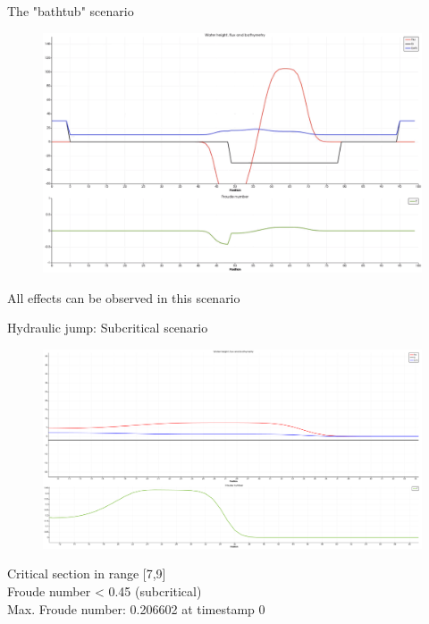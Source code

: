 \documentclass[shortpres]{beamer}
\newcommand{\imgfullscale}{0.75}
\begin{document}
\begin{frame}{The "bathtub" scenario}
	\begin{figure}
		\includegraphics[clip, width=\imgfullscale\linewidth]{img/bathtub.png}
	\end{figure}
	All effects can be observed in this scenario
\end{frame}

\begin{frame}{Hydraulic jump: Subcritical scenario}
	\begin{figure}
		\includegraphics[clip, width=\imgfullscale\linewidth]{img/Subcritical.png}
	\end{figure}
	Critical section in range [7,9]\\
	Froude number < 0.45 (subcritical)\\
	Max. Froude number: 0.206602 at timestamp 0
\end{frame}
\end{document}
